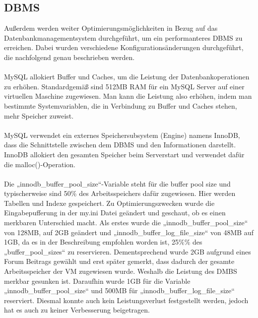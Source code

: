 \subsection{DBMS}\label{subsec:dbms}
Außerdem werden weiter Optimierungsmöglichkeiten in Bezug auf das Datenbankmanagementsystem durchgeführt, um ein performanteres DBMS zu erreichen.
Dabei wurden verschiedene Konfigurationsänderungen durchgeführt, die nachfolgend genau beschrieben werden.\\
\\
MySQL allokiert Buffer und Caches, um die Leistung der Datenbankoperationen zu erhöhen.
Standardgemäß sind 512MB RAM für ein MySQL Server auf einer virtuellen Maschine zugewiesen.
Man kann die Leistung also erhöhen, indem man bestimmte Systemvariablen, die in Verbindung zu Buffer und Caches stehen, mehr Speicher zuweist.\\
\\
MySQL verwendet ein externes Speichersubsystem (Engine) namens InnoDB, dass die Schnittstelle zwischen dem DBMS und den Informationen darstellt.
InnoDB allokiert den gesamten Speicher beim Serverstart und verwendet dafür die malloc()-Operation.\\
\\
Die „innodb\_buffer\_pool\_size“-Variable steht für die buffer pool size und typischerweise sind 50\% des Arbeitsspeichers dafür zugewiesen.
Hier werden Tabellen und Indexe gespeichert.
Zu Optimierungszwecken wurde die Eingabepufferung in der my.ini Datei geändert und geschaut, ob es einen merkbaren Unterschied macht.
Als erstes wurde die „innodb\_buffer\_pool\_size“ von 128MB, auf 2GB geändert und „innodb\_buffer\_log\_file\_size“ von 48MB auf 1GB, da es in der Beschreibung empfohlen worden ist, 25\%\% des „buffer\_pool\_sizes“ zu reservieren.
Dementsprechend wurde 2GB aufgrund eines Forum Beitrags gewählt und erst später gemerkt, dass dadurch der gesamte Arbeitsspeicher der VM zugewiesen wurde.
Weshalb die Leistung des DMBS merkbar gesunken ist.
Daraufhin wurde 1GB für die Variable „innodb\_buffer\_pool\_size“ und 500MB für „innodb\_buffer\_log\_file\_size“ reserviert.
Diesmal konnte auch kein Leistungsverlust festgestellt werden, jedoch hat es auch zu keiner Verbesserung beigetragen.~\autocite{orcale-2022}~\autocite{stackexchange-2012}

